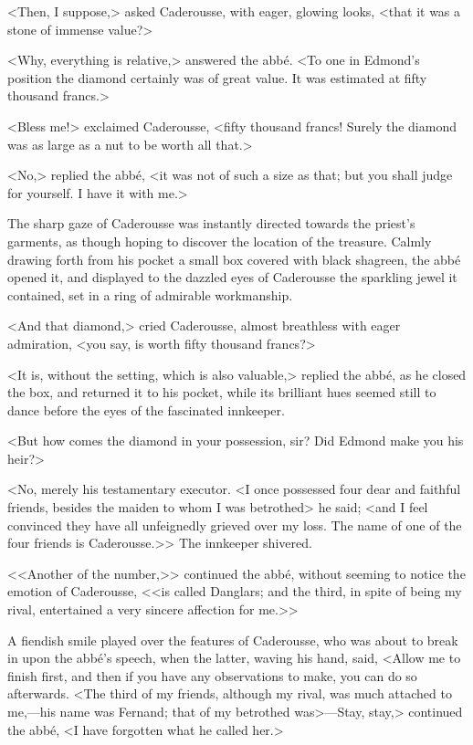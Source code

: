  <Then, I suppose,> asked Caderousse, with eager, glowing looks, <that it was a stone of immense value?> 

 <Why, everything is relative,> answered the abbé. <To one in Edmond's position the diamond certainly was of great value. It was estimated at fifty thousand francs.> 

 <Bless me!> exclaimed Caderousse, <fifty thousand francs! Surely the diamond was as large as a nut to be worth all that.> 

 <No,> replied the abbé, <it was not of such a size as that; but you shall judge for yourself. I have it with me.> 

 The sharp gaze of Caderousse was instantly directed towards the priest's garments, as though hoping to discover the location of the treasure. Calmly drawing forth from his pocket a small box covered with black shagreen, the abbé opened it, and displayed to the dazzled eyes of Caderousse the sparkling jewel it contained, set in a ring of admirable workmanship. 

 <And that diamond,> cried Caderousse, almost breathless with eager admiration, <you say, is worth fifty thousand francs?> 

 <It is, without the setting, which is also valuable,> replied the abbé, as he closed the box, and returned it to his pocket, while its brilliant hues seemed still to dance before the eyes of the fascinated innkeeper. 

 <But how comes the diamond in your possession, sir? Did Edmond make you his heir?> 

 <No, merely his testamentary executor. <I once possessed four dear and faithful friends, besides the maiden to whom I was betrothed> he said; <and I feel convinced they have all unfeignedly grieved over my loss. The name of one of the four friends is Caderousse.>> The innkeeper shivered. 

 <<Another of the number,>> continued the abbé, without seeming to notice the emotion of Caderousse, <<is called Danglars; and the third, in spite of being my rival, entertained a very sincere affection for me.>> 

 A fiendish smile played over the features of Caderousse, who was about to break in upon the abbé's speech, when the latter, waving his hand, said, <Allow me to finish first, and then if you have any observations to make, you can do so afterwards. <The third of my friends, although my rival, was much attached to me,—his name was Fernand; that of my betrothed was>—Stay, stay,> continued the abbé, <I have forgotten what he called her.> 

